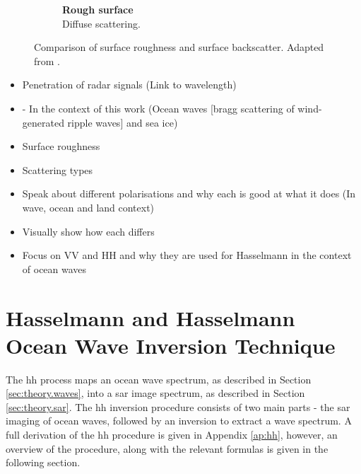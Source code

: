 \begin{figure} [H]
\begin{subfigure}{0.31\textwidth}
        \caption{\textbf{Rough surface} \\ Diffuse scattering.}
        \label{fig:theory.data.suface.diffuse}
    \end{subfigure}    
    \caption{Comparison of surface roughness and surface backscatter. Adapted from \cite{Meyer2019}.}
    \label{fig:theory.data.surface}
\end{figure}

\begin{itemize}
    \item Penetration of radar signals (Link to wavelength)
    \item - In the context of this work (Ocean waves [bragg scattering of wind-generated ripple waves] and sea ice)
    \item Surface roughness
    \item Scattering types
\end{itemize}

\begin{itemize}
    \item Speak about different polarisations and why each is good at what it does (In wave, ocean and land context)
    \item Visually show how each differs
    \item Focus on VV and HH and why they are used for Hasselmann in the context of ocean waves
\end{itemize}

\section{Hasselmann and Hasselmann Ocean Wave Inversion Technique} \label{sec:theory.hasselmann}
The \ac{hh} process maps an ocean wave spectrum, as described in Section \ref{sec:theory.waves}, into a \ac{sar} image spectrum, as described in Section \ref{sec:theory.sar}. The \ac{hh} inversion procedure consists of two main parts - the \acs{sar} imaging of ocean waves, followed by an inversion to extract a wave spectrum. A full derivation of the \ac{hh} procedure is given in Appendix \ref{ap:hh}, however, an overview of the procedure, along with the relevant formulas is given in the following section.

